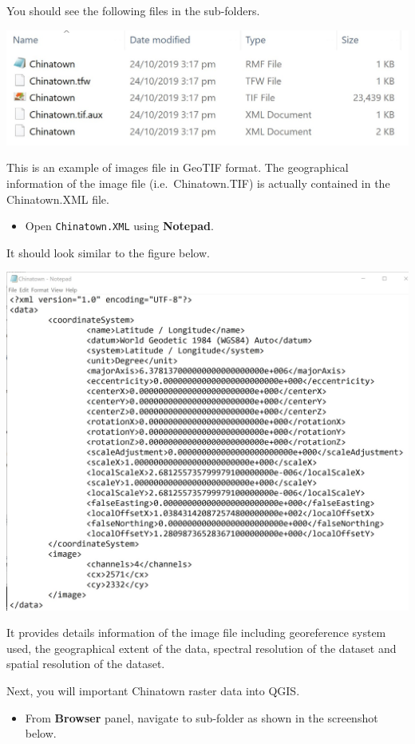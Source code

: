 \documentclass[
  letterpaper,
  DIV=11,
  numbers=noendperiod]{scrreprt}
\providecommand{\tightlist}{%
  \setlength{\itemsep}{0pt}\setlength{\parskip}{0pt}}\usepackage{longtable,booktabs,array}
\begin{document}
You should see the following files in the sub-folders.

\includegraphics{./img02/image25.jpg}

This is an example of images file in GeoTIF format. The geographical
information of the image file (i.e.~Chinatown.TIF) is actually contained
in the Chinatown.XML file.

\begin{itemize}
\tightlist
\item
  Open \texttt{Chinatown.XML} using \textbf{Notepad}.
\end{itemize}

It should look similar to the figure below.

\includegraphics{./img02/image26.jpg}

It provides details information of the image file including georeference
system used, the geographical extent of the data, spectral resolution of
the dataset and spatial resolution of the dataset.

Next, you will important Chinatown raster data into QGIS.

\begin{itemize}
\tightlist
\item
  From \textbf{Browser} panel, navigate to sub-folder as shown in the
  screenshot below.
\end{itemize}
\end{document}
